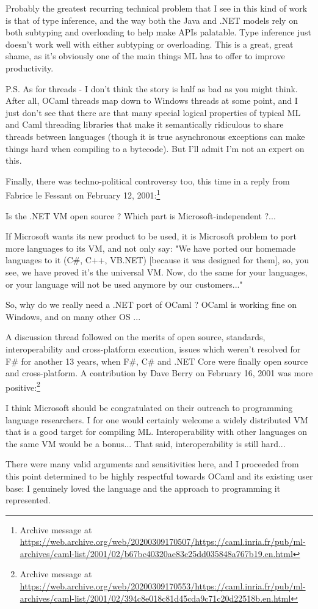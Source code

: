 \documentclass[acmsmall]{acmart}\settopmatter{}
\begin{document}
\begin{verbquote}
Probably the greatest recurring technical problem that I see in this kind of work is that of type inference, and the way both the Java and .NET models rely on both subtyping and overloading to help make APIs palatable.  Type inference just doesn't work well with either subtyping or overloading.  This is a great, great shame, as it's obviously one of the main things ML has to offer to improve productivity.  

P.S. As for threads - I don't think the story is half as bad as you might think.  After all, OCaml threads map down to Windows threads at some point, and I just don't see that there are that many special logical properties of typical ML and Caml threading libraries that make it semantically ridiculous to share threads between languages (though it is true asynchronous exceptions can make things hard when compiling to a bytecode).  But I'll admit I'm not an expert on this. 
\end{verbquote}
Finally, there was techno-political controversy too, this time in a reply from Fabrice le Fessant on February 12, 2001:\footnote{Archive message at \url{https://web.archive.org/web/20200309170507/https://caml.inria.fr/pub/ml-archives/caml-list/2001/02/b67bc40320ae83c25dd035848a767b19.en.html}}
\begin{verbquote}
Is the .NET VM open source ? Which part is Microsoft-independent ?...

If Microsoft wants its new product to be used, it is Microsoft problem to port more languages to its VM, and not only say: "We have ported our homemade languages to it (C\#, C++, VB.NET) [because it was designed for them], so, you see, we have proved it's the universal VM. Now, do the same for your languages, or your language will not be used anymore by our customers..."

So, why do we really need a .NET port of OCaml ? OCaml is working fine on Windows, and on many other OS ... 
\end{verbquote}
A discussion thread followed on the merits of open source, standards, interoperability and cross-platform execution, issues which weren’t resolved for F\# for another 13 years, when F\#, C\# and .NET Core were finally open source and cross-platform.  A contribution by Dave Berry on February 16, 2001 was more positive:\footnote{Archive message at \url{https://web.archive.org/web/20200309170553/https://caml.inria.fr/pub/ml-archives/caml-list/2001/02/394c8e018c81d45cda9c71c20d22518b.en.html}}
\begin{verbquote}
I think Microsoft should be congratulated on their outreach to programming language researchers.  I for one would certainly welcome a widely distributed VM that is a good target for compiling ML.  Interoperability with other languages on the same VM would be a bonus... That said, interoperability is still hard...
\end{verbquote}
There were many valid arguments and sensitivities here, and I proceeded from this point determined to be highly respectful towards OCaml and its existing user base: I genuinely loved the language and the approach to programming it represented. 
\end{document}
